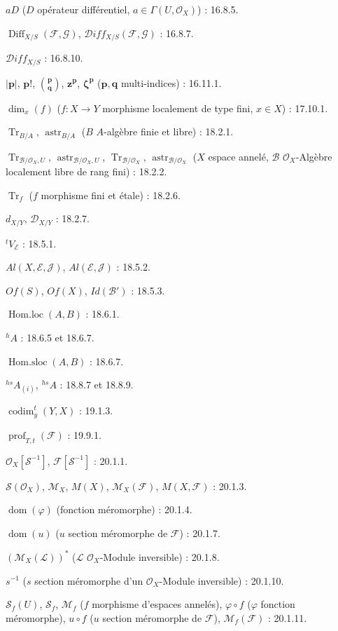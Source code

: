 $aD$ ($D$ opérateur différentiel, $a\in\Gamma(U,\mathcal{O}_X)$) : 16.8.5.

$\operatorname{Diff}_{X/S}(\mathcal{F},\mathcal{G})$,
$\mathcal{D}iff_{X/S}(\mathcal{F},\mathcal{G})$ : 16.8.7.

$\mathcal{D}iff_{X/S}$ : 16.8.10.

$|\mathbf p|$, $\mathbf p!$, $\binom{\mathbf p}{\mathbf q}$,
$\mathbf z^{\mathbf p}$, $\boldsymbol\zeta^{\mathbf p}$
($\mathbf p,\mathbf q$ multi-indices) : 16.11.1.

$\dim_x(f)$ ($f:X\to Y$ morphisme localement de type fini, $x\in X$) : 17.10.1.

$\operatorname{Tr}_{B/A}$, $\operatorname{astr}_{B/A}$
($B$ $A$-algèbre finie et libre) : 18.2.1.

$\operatorname{Tr}_{\mathcal B/\mathcal O_X,U}$,
$\operatorname{astr}_{\mathcal B/\mathcal O_X,U}$,
$\operatorname{Tr}_{\mathcal B/\mathcal O_X}$,
$\operatorname{astr}_{\mathcal B/\mathcal O_X}$
($X$ espace annelé, $\mathcal B$ $\mathcal O_X$-Algèbre localement libre de rang fini) : 18.2.2.

$\operatorname{Tr}_f$ ($f$ morphisme fini et étale) : 18.2.6.

$d_{X/Y}$, $\mathcal D_{X/Y}$ : 18.2.7.

${}^{t}V_{\mathcal E}$ : 18.5.1.

$Al(X,\mathcal E,\mathcal J)$, $Al(\mathcal E,\mathcal J)$ : 18.5.2.

$Of(S)$, $Of(X)$, $Id(\mathcal B')$ : 18.5.3.

$\operatorname{Hom.loc}(A,B)$ : 18.6.1.

${}^{h}A$ : 18.6.5 et 18.6.7.

$\operatorname{Hom.sloc}(A,B)$ : 18.6.7.

${}^{hs}A_{(i)}$, ${}^{hs}A$ : 18.8.7 et 18.8.9.

$\operatorname{codim}^{t}_{y}(Y,X)$ : 19.1.3.

$\operatorname{prof}_{T,t}(\mathcal F)$ : 19.9.1.

$\mathcal O_X[\mathcal S^{-1}]$, $\mathcal F[\mathcal S^{-1}]$ : 20.1.1.

$\mathcal S(\mathcal O_X)$, $\mathcal M_X$, $M(X)$,
$\mathcal M_X(\mathcal F)$, $M(X,\mathcal F)$ : 20.1.3.

$\operatorname{dom}(\varphi)$ (fonction méromorphe) : 20.1.4.

$\operatorname{dom}(u)$ ($u$ section méromorphe de $\mathcal F$) : 20.1.7.

$(\mathcal M_X(\mathcal L))^{*}$
($\mathcal L$ $\mathcal O_X$-Module inversible) : 20.1.8.

$s^{-1}$ ($s$ section méromorphe d'un $\mathcal O_X$-Module inversible) : 20.1.10.

$\mathcal S_f(U)$, $\mathcal S_f$, $\mathcal M_f$
($f$ morphisme d'espaces annelés), $\varphi\circ f$ ($\varphi$ fonction méromorphe),
$u\circ f$ ($u$ section méromorphe de $\mathcal F$), $\mathcal M_f(\mathcal F)$ : 20.1.11.

